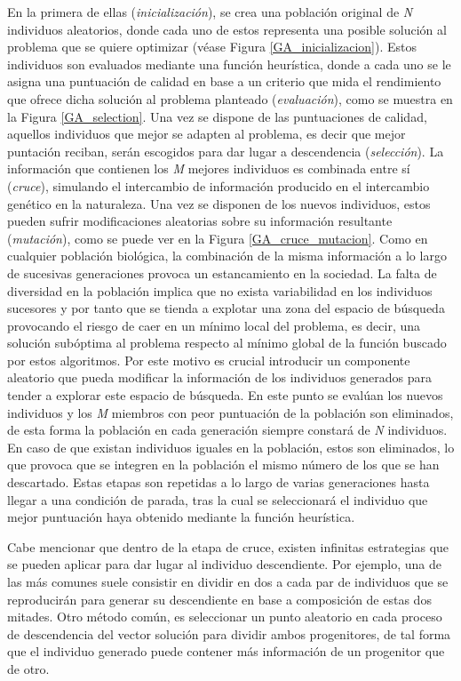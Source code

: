 \documentclass{uathesis-es}
\begin{document}
En la primera de ellas (\textit{inicialización}), se crea una población original de \textit{N} individuos aleatorios, donde cada uno de estos representa una posible solución al problema que se quiere optimizar (véase Figura \ref{GA_inicializacion}). Estos individuos son evaluados mediante una función heurística, donde a cada uno se le asigna una puntuación de calidad en base a un criterio que mida el rendimiento que ofrece dicha solución al problema planteado (\textit{evaluación}), como se muestra en la Figura \ref{GA_selection}. Una vez se dispone de las puntuaciones de calidad, aquellos individuos que mejor se adapten al problema, es decir que mejor puntación reciban, serán escogidos para dar lugar a descendencia (\textit{selección}). La información que contienen los \textit{M} mejores individuos es combinada entre sí (\textit{cruce}), simulando el intercambio de información producido en el intercambio genético en la naturaleza. Una vez se disponen de los nuevos individuos, estos pueden sufrir modificaciones aleatorias sobre su información resultante (\textit{mutación}), como se puede ver en la Figura \ref{GA_cruce_mutacion}. Como en cualquier población biológica, la combinación  de la misma información a lo largo de sucesivas generaciones provoca un estancamiento en la sociedad. La falta de diversidad en la población implica que no exista variabilidad en los individuos sucesores y por tanto que se tienda a explotar una zona del espacio de búsqueda provocando el riesgo de caer en un mínimo local del problema, es decir, una solución subóptima al problema respecto al mínimo global de la función buscado por estos algoritmos. Por este motivo es crucial introducir un componente aleatorio que pueda modificar la información de los individuos generados para tender a explorar este espacio de búsqueda. En este punto se evalúan los nuevos individuos y los \textit{M} miembros con peor puntuación de la población son eliminados, de esta forma la población en cada generación siempre constará de \textit{N} individuos. En caso de que existan individuos iguales en la población, estos son eliminados, lo que provoca que se integren en la población el mismo número de los que se han descartado. Estas etapas son repetidas a lo largo de varias generaciones hasta llegar a una condición de parada, tras la cual se seleccionará el individuo que mejor puntuación haya obtenido mediante la función heurística.

Cabe mencionar que dentro de la etapa de cruce, existen infinitas estrategias que se pueden aplicar para dar lugar al individuo descendiente. Por ejemplo, una de las más comunes suele consistir en dividir en dos a cada par de individuos que se reproducirán para generar su descendiente en base a composición de estas dos mitades. Otro método común, es seleccionar un punto aleatorio en cada proceso de descendencia del vector solución para dividir ambos progenitores, de tal forma que el individuo generado puede contener más información de un progenitor que de otro.
\end{document}
